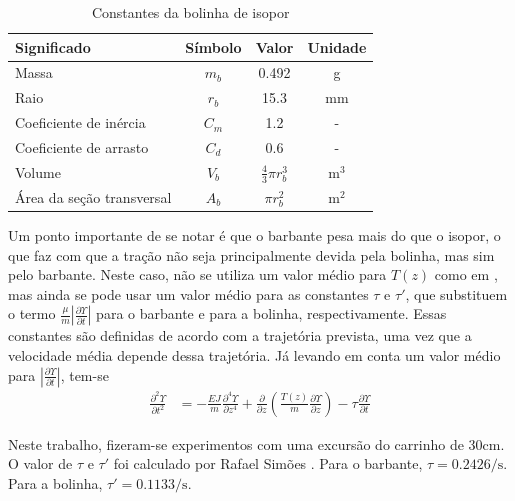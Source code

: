 \begin{table}[!ht]
	\centering
	\begin{tabular}{|l|c|c|c|}
		\hline
		\textbf{Significado} & \textbf{Símbolo} & \textbf{Valor} & \textbf{Unidade}\\ \hline \hline
		Massa & $m_{b}$ & 0.492 & g\\ \hline
		Raio & $r_{b}$ & 15.3 & mm\\ \hline
		Coeficiente de inércia & $C_m$ & 1.2 & - \\ \hline
		Coeficiente de arrasto & $C_d$ & 0.6 & - \\ \hline
		Volume & $V_b$ & $\frac{4}{3}\pi r_b^3$ & $\textrm{m}^3$ \\ \hline
		Área da seção transversal & $A_b$ & $\pi r_b^2$ & m$^2$\\ \hline
	\end{tabular}
	\caption{Constantes da bolinha de isopor\label{constanteIsopor}}
\end{table}


 Um ponto importante de se notar é que o barbante pesa mais do que o isopor, o que faz com que a tração não seja principalmente devida pela bolinha, mas sim pelo barbante. Neste caso, não se utiliza um valor médio para $T(z)$ como em \cite{fabricioIFAC}, mas ainda se pode usar um valor médio para as constantes $\tau$ e $\tau'$, que substituem o termo $\frac{\mu}{m}\left|\frac{\partial \Upsilon}{\partial t}\right|$ para o barbante e para a bolinha, respectivamente. Essas constantes são definidas de acordo com a trajetória prevista, uma vez que a velocidade média depende dessa trajetória. Já levando em conta um valor médio para $\left|\frac{\partial \Upsilon}{\partial t}\right|$, tem-se \begin{align}
	\frac{\partial^2 \Upsilon}{\partial t^2} &= -\frac{EJ}{m}\frac{\partial^4 \Upsilon}{\partial z^4} + \frac{\partial}{\partial z}\left(\frac{T(z)}{m}\frac{\partial \Upsilon}{\partial z}\right) - \tau\frac{\partial \Upsilon}{\partial t}\label{EquacaoComTau}
	\end{align}

 Neste trabalho, fizeram-se experimentos com uma excursão do carrinho de 30cm. O valor de $\tau$ e $\tau'$ foi calculado por Rafael Simões \cite{rafaelMestrado}. Para o barbante, $\tau = 0.2426/\mathrm{s}$. Para a bolinha, $\tau'=0.1133/\mathrm{s}$.
 
